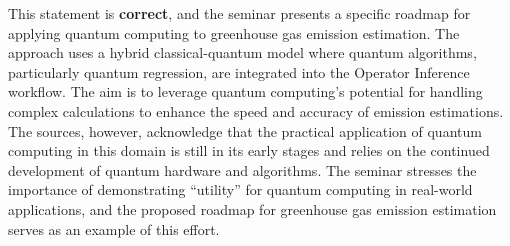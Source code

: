 \documentclass[
]{article}
\begin{document}
\begin{itemize}
  This statement is \textbf{correct}, and the seminar presents a
  specific roadmap for applying quantum computing to greenhouse gas
  emission estimation. The approach uses a hybrid classical-quantum
  model where quantum algorithms, particularly quantum regression, are
  integrated into the Operator Inference workflow. The aim is to
  leverage quantum computing's potential for handling complex
  calculations to enhance the speed and accuracy of emission
  estimations. The sources, however, acknowledge that the practical
  application of quantum computing in this domain is still in its early
  stages and relies on the continued development of quantum hardware and
  algorithms. The seminar stresses the importance of demonstrating
  ``utility'' for quantum computing in real-world applications, and the
  proposed roadmap for greenhouse gas emission estimation serves as an
  example of this effort.
\end{itemize}
\end{document}
